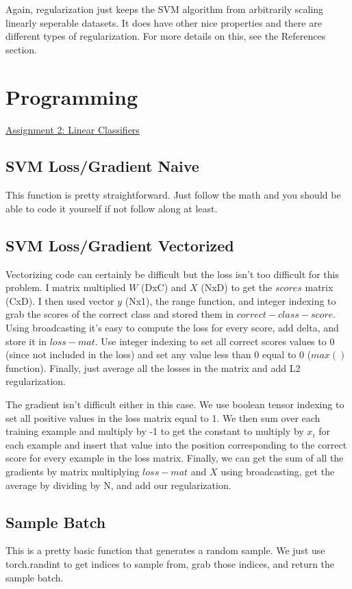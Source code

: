 \documentclass[12pt]{article}
\begin{document}
Again, regularization just keeps the SVM algorithm from arbitrarily scaling linearly seperable datasets. It does
have other nice properties and there are different types of regularization.
For more details on this, see the References section.

\section{Programming}
\href{https://github.com/bensmidt/EECS-498-DL-Computer-Vision/tree/main/A2}{Assignment 2: Linear Classifiers}

\subsection{SVM Loss/Gradient Naive}
This function is pretty straightforward. Just follow the math and you should 
be able to code it yourself if not follow along at least. 

\subsection{SVM Loss/Gradient Vectorized}
Vectorizing code can certainly be difficult but the loss isn't too difficult
for this problem. I matrix multiplied $W$ (DxC) and $X$ (NxD) to get the $scores$ matrix
(CxD). I then used vector $y$ (Nx1), the range function, and integer indexing to grab
the scores of the correct class and stored them in $correct-class-score$. Using broadcasting
it's easy to compute the loss for every score, add delta, and store it in $loss-mat$. 
Use integer indexing to set all correct scores values to 0 (since not included in the loss)
and set any value less than 0 equal to 0 ($max()$ function). Finally, just average all the 
losses in the matrix and add L2 regularization. 

The gradient isn't difficult either in this case. We use boolean tensor indexing to set 
all positive values in the loss matrix equal to 1. We then sum over each training example and 
multiply by -1 to get the constant to multiply by $x_i$ for each example and insert that value 
into the position corresponding to the correct score for every example in the loss matrix. Finally, 
we can get the sum of all the gradients by matrix multiplying $loss-mat$ and $X$ using broadcasting,
 get the average by dividing by N, and add our regularization. 

\subsection{Sample Batch}
This is a pretty basic function that generates a random sample. We just use torch.randint 
to get indices to sample from, grab those indices, and return the sample batch. 
\end{document}
